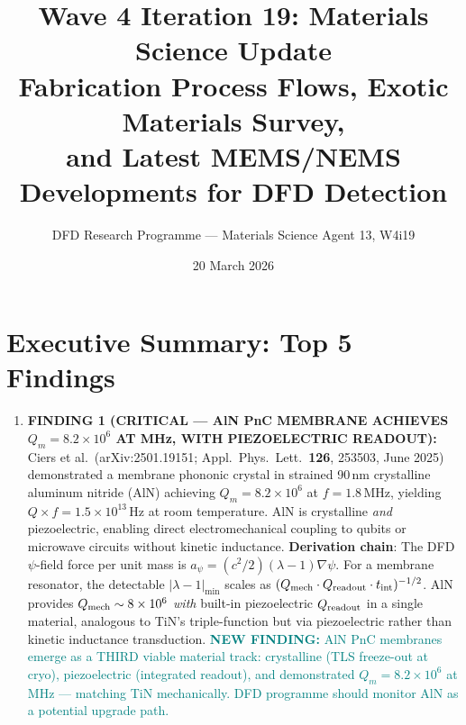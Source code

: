 \documentclass[11pt]{article}
\title{Wave 4 Iteration 19: Materials Science Update\\
\large Fabrication Process Flows, Exotic Materials Survey,\\
and Latest MEMS/NEMS Developments for DFD Detection}
\author{DFD Research Programme --- Materials Science Agent 13, W4i19}
\date{20 March 2026}
\theoremstyle{remark}
\newcommand{\ee}[1]{\times 10^{#1}}
\newcommand{\newfinding}[1]{\textcolor{teal}{\textbf{NEW FINDING:} #1}}
\begin{document}
\maketitle
\tableofcontents
\newpage

\section{Executive Summary: Top 5 Findings}
\label{sec:top5}

\begin{tcolorbox}[colback=blue!5!white, colframe=blue!50!black,
  title=\textbf{W4i19 TOP 5 FINDINGS --- Ranked by Programme Impact}]
\begin{enumerate}

\item \textbf{FINDING 1 (CRITICAL --- AlN PnC MEMBRANE ACHIEVES $Q_m = 8.2\ee{6}$
AT MHz, WITH PIEZOELECTRIC READOUT):}
Ciers et al.\ (arXiv:2501.19151; Appl.\ Phys.\ Lett.\ \textbf{126},
253503, June 2025) demonstrated a membrane phononic crystal in strained
90\,nm crystalline aluminum nitride (AlN) achieving
$Q_m = 8.2\ee{6}$ at $f = 1.8$\,MHz, yielding
$Q \times f = 1.5\ee{13}$\,Hz at room temperature. AlN is
crystalline \emph{and} piezoelectric, enabling direct electromechanical
coupling to qubits or microwave circuits without kinetic inductance.
\textbf{Derivation chain}: The DFD $\psi$-field force per unit mass is
$a_\psi = (c^2/2)(\lambda - 1)\nabla\psi$. For a membrane resonator,
the detectable $|\lambda - 1|_{\min}$ scales as
$(Q_{\rm mech} \cdot Q_{\rm readout} \cdot t_{\rm int})^{-1/2}$. AlN
provides $Q_{\rm mech} \sim 8\ee{6}$ \emph{with} built-in piezoelectric
$Q_{\rm readout}$ in a single material, analogous to TiN's triple-function
but via piezoelectric rather than kinetic inductance transduction.
\newfinding{AlN PnC membranes emerge as a THIRD viable material track:
crystalline (TLS freeze-out at cryo), piezoelectric (integrated readout),
and demonstrated $Q_m = 8.2\ee{6}$ at MHz --- matching TiN mechanically.
DFD programme should monitor AlN as a potential upgrade path.}


\end{enumerate}
\end{tcolorbox}
\end{document}
